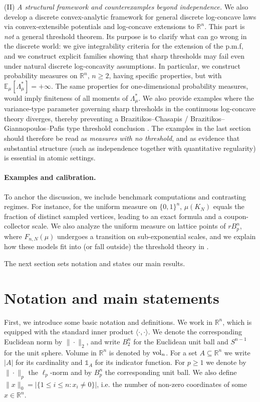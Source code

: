 \documentclass[11pt,a4paper]{article} %
\theoremstyle{definition}
\theoremstyle{remark}
\newcommand{\R}{\mathbb{R}}
\newcommand{\E}{\mathbb{E}}
\newcommand{\1}{\mathds{1}}
\newcommand{\vol}{{\rm{vol}}}
\begin{document}
(II) \emph{A structural framework and counterexamples beyond independence.}
We also develop a discrete convex-analytic framework for general discrete log-concave laws via convex-extensible potentials and log-concave
extensions to $\R^n$. This part is \emph{not} a general threshold theorem. Its purpose is to clarify what can go wrong in the discrete world:
we give integrability criteria for the extension of the p.m.f, and we construct explicit families showing that sharp thresholds may fail even under natural
discrete log-concavity assumptions. In particular, we construct probability measures on $\mathbb{R}^n, \, n \geq 2$, having specific properties, but with $\E_\mu[\Lambda_\mu^\ast]=+\infty$. The same properties for one-dimensional probability measures, would imply finiteness of all moments of $\Lambda_\mu^\ast$. We also provide examples where the variance-type
parameter governing sharp thresholds in the continuous log-concave theory diverges, thereby preventing a Brazitikos--Chasapis / Brazitikos--Giannopoulos--Pafis
type threshold conclusion \cite{BC,BGP}. The examples in the last section should therefore be read as \emph{measures with no  threshold},
and as evidence that substantial structure (such as independence together with quantitative regularity) is essential in atomic settings.

\paragraph{Examples and calibration.}
To anchor the discussion, we include benchmark computations and contrasting regimes. For instance, for the uniform measure on $\{0,1\}^n$, $\mu(K_N)$ equals the fraction of distinct sampled vertices, leading to an exact formula and a coupon-collector scale.
We also analyze the uniform measure on lattice points of $rB_p^n$, where $F_{n,N}(\mu)$ undergoes a transition on sub-exponential scales, and
we explain how these models fit into (or fall outside) the threshold theory in \cite{BC,BGP}.

The next section sets notation and states our main results.



\section{Notation and main statements}
First, we introduce some basic notation and definitions. We work in ${\mathbb R}^n$, which is equipped with the standard inner product  $\langle\cdot ,\cdot\rangle $. We denote the corresponding Euclidean norm by $\|\cdot \|_2$, and write $B_2^n$ for the Euclidean unit ball and $S^{n-1}$ for the unit sphere. Volume in $\mathbb{R}^n$ is denoted by $\vol_n$. For a set $A \subseteq \mathbb{R}^n$ we write $|A|$ for its cardinality and $\mathds{1}_A$ for its indicator function. For $p \geq 1$ we denote by $\|\cdot\|_p$ the $\ell_p$-norm and by $B_p^n$ the corresponding unit ball. We also define $\|x\|_0=|\{1\leq i \leq n: x_i \neq 0\}|$, i.e. the number of non-zero coordinates of some $x \in \mathbb{R}^n$.
\end{document}
